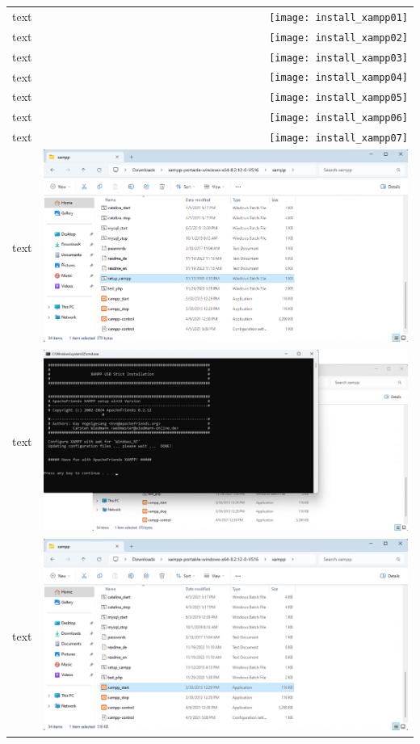 \documentclass[11pt,a4paper]{report}
\begin{document}
        \begin{tabular}{ l r }
            text & \texttt{[image: install\_xampp01]} \\ %
            text & \texttt{[image: install\_xampp02]} \\
            text & \texttt{[image: install\_xampp03]} \\
            text & \texttt{[image: install\_xampp04]} \\
            text & \texttt{[image: install\_xampp05]} \\
            text & \texttt{[image: install\_xampp06]} \\
            text & \texttt{[image: install\_xampp07]} \\
            text & \includegraphics[scale=1.0]{install_xampp08} \\
            text & \includegraphics[scale=1.0]{install_xampp09} \\
            text & \includegraphics[scale=1.0]{install_xampp10} \\

\end{tabular}
\end{document}
